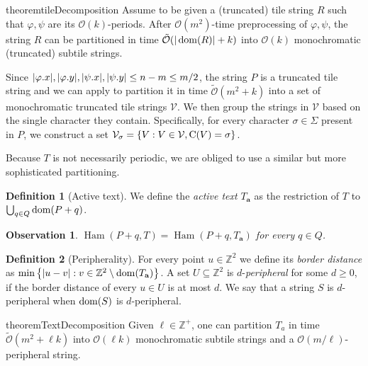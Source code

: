 \documentclass[11pt, letterpaper]{article}
\theoremstyle{plain}
\newtheorem{observation}{Observation}
\theoremstyle{definition}
\newtheorem{definition}{Definition}
\theoremstyle{remark}
\newcommand{\Z}{\mathbb{Z}}
\renewcommand{\O}{\mathcal{O}}
\newcommand{\tO}{\tilde{\mathcal{O}}}
\newcommand{\V}{\mathcal{V}}
\renewcommand{\phi}{\varphi}
\newcommand{\set}[1]{\left\lbrace #1 \right\rbrace}
\DeclareMathOperator*{\Ham}{Ham}
\begin{document}
\begin{restatable*}{theorem}{tileDecomposition}\label{tile_decomposition}
Assume to be given a (truncated) tile string $R$ such that $\phi, \psi$ are its $\O(k)$-periods. After $\O(m^2)$-time preprocessing of $\phi, \psi$, the string $R$ can be partitioned in time $\tO(|\d{R}| + k)$ into $\O(k)$ monochromatic (truncated) subtile strings.
\end{restatable*}

Since $|\x{\phi}|, |\y{\phi}|, |\x{\psi}|, |\y{\psi}| \le n - m \le m / 2$, the string $P$ is a truncated tile string and we can apply  to partition it in time $\tO(m^2 + k)$ into a set of monochromatic truncated tile strings $\V$. We then group the strings in $\V$ based on the single character they contain. Specifically, for every character $\sigma \in \Sigma$ present in $P$, we construct a set $\V_\sigma = \set{V : V \in \V, \getchar{V} = \sigma}$.



Because $T$ is not necessarily periodic, we are obliged to use a similar but more sophisticated partitioning.

\newcommand{\Ta}{T_\mathbf{a}}
\begin{definition}[Active text]
We define the \emph{active text} $\Ta$ as the restriction of $T$ to $\bigcup_{q \in Q} \operatorname*{dom}(P + q)$. 
\end{definition}

\begin{observation}\label{obs:active_text}
$\Ham(P + q, T) = \Ham(P + q, \Ta)$ for every $q \in Q$.
\end{observation}

\begin{definition}[Peripherality]
For every point $u \in \Z^2$ we define its \emph{border distance} as $\min\set{|u - v| : v \in \Z^2 \setminus \d{\Ta}}$. A set $U \subseteq \Z^2$ is $d$-\emph{peripheral} for some $d \ge 0$, if the border distance of every $u \in U$ is at most $d$. We say that a string $S$ is $d$-peripheral when $\operatorname*{dom}(S)$ is $d$-peripheral.
\end{definition}

\begin{restatable*}{theorem}{TextDecomposition}\label{text_decomposition}
Given $\ell \in \Z^+$, one can partition $T_a$ in time $\tO(m^2 + \ell k)$ into $\O(\ell k)$ monochromatic subtile strings and a $\O(m / \ell)$-peripheral string.
\end{restatable*}
\end{document}
